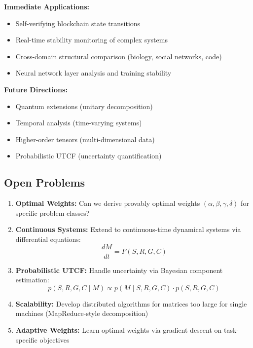 \documentclass[11pt,a4paper]{article}
\theoremstyle{definition}
\theoremstyle{remark}
\begin{document}
\textbf{Immediate Applications:}
\begin{itemize}
\item Self-verifying blockchain state transitions
\item Real-time stability monitoring of complex systems
\item Cross-domain structural comparison (biology, social networks, code)
\item Neural network layer analysis and training stability
\end{itemize}

\textbf{Future Directions:}
\begin{itemize}
\item Quantum extensions (unitary decomposition)
\item Temporal analysis (time-varying systems)
\item Higher-order tensors (multi-dimensional data)
\item Probabilistic UTCF (uncertainty quantification)
\end{itemize}

\subsection{Open Problems}

\begin{enumerate}
\item \textbf{Optimal Weights:} Can we derive provably optimal weights $(\alpha, \beta, \gamma, \delta)$ for specific problem classes?

\item \textbf{Continuous Systems:} Extend to continuous-time dynamical systems via differential equations:
\begin{equation}
\frac{dM}{dt} = F(S, R, G, C)
\end{equation}

\item \textbf{Probabilistic UTCF:} Handle uncertainty via Bayesian component estimation:
\begin{equation}
p(S, R, G, C \mid M) \propto p(M \mid S, R, G, C) \cdot p(S, R, G, C)
\end{equation}

\item \textbf{Scalability:} Develop distributed algorithms for matrices too large for single machines (MapReduce-style decomposition)

\item \textbf{Adaptive Weights:} Learn optimal weights via gradient descent on task-specific objectives
\end{enumerate}
\end{document}
